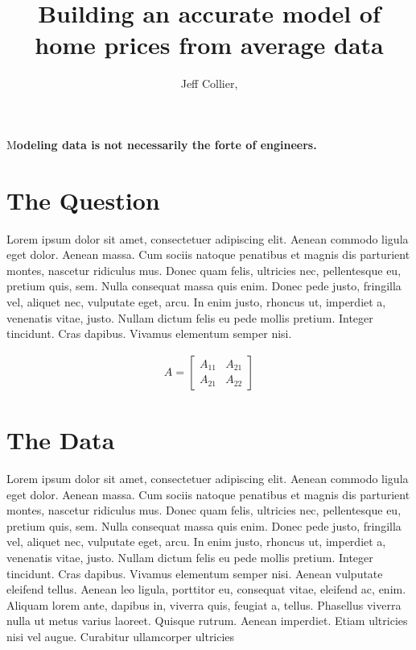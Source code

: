\documentclass[ DIV=calc,%
                            paper=a4,%
                            fontsize=11pt,%
                            twocolumn]{scrartcl}                        %
\title{Building an accurate model of home prices from average data}                   %
\author{Jeff Collier, }                                           %
\date{}                                                                             %
\newcommand{\initial}[1]{%
     \lettrine[lines=3,lhang=0.3,nindent=0em]{
                    \color{VCUGold}
                    {\textsf{#1}}}{}}
\begin{document}
\maketitle
\thispagestyle{fancy}           %
\initial{M}\textbf{odeling data is not necessarily the forte of engineers.}

\section*{The Question}
Lorem ipsum dolor sit amet, consectetuer adipiscing elit. Aenean commodo ligula eget dolor. Aenean massa. Cum sociis natoque penatibus et magnis dis parturient montes, nascetur ridiculus mus. Donec quam felis, ultricies nec, pellentesque eu, pretium quis, sem. Nulla consequat massa quis enim. Donec pede justo, fringilla vel, aliquet nec, vulputate eget, arcu. In enim justo, rhoncus ut, imperdiet a, venenatis vitae, justo. Nullam dictum felis eu pede mollis pretium. Integer tincidunt. Cras dapibus. Vivamus elementum semper nisi.

\begin{align}
    A = 
    \begin{bmatrix}
    A_{11} & A_{21} \\
    A_{21} & A_{22}
    \end{bmatrix}
\end{align}

\section*{The Data}
Lorem ipsum dolor sit amet, consectetuer adipiscing elit. Aenean commodo ligula eget dolor. Aenean massa. Cum sociis natoque penatibus et magnis dis parturient montes, nascetur ridiculus mus. Donec quam felis, ultricies nec, pellentesque eu, pretium quis, sem. Nulla consequat massa quis enim. Donec pede justo, fringilla vel, aliquet nec, vulputate eget, arcu. In enim justo, rhoncus ut, imperdiet a, venenatis vitae, justo. Nullam dictum felis eu pede mollis pretium. Integer tincidunt. Cras dapibus. Vivamus elementum semper nisi. Aenean vulputate eleifend tellus. Aenean leo ligula, porttitor eu, consequat vitae, eleifend ac, enim. Aliquam lorem ante, dapibus in, viverra quis, feugiat a, tellus. Phasellus viverra nulla ut metus varius laoreet. Quisque rutrum. Aenean imperdiet. Etiam ultricies nisi vel augue. Curabitur ullamcorper ultricies 
\end{document}
